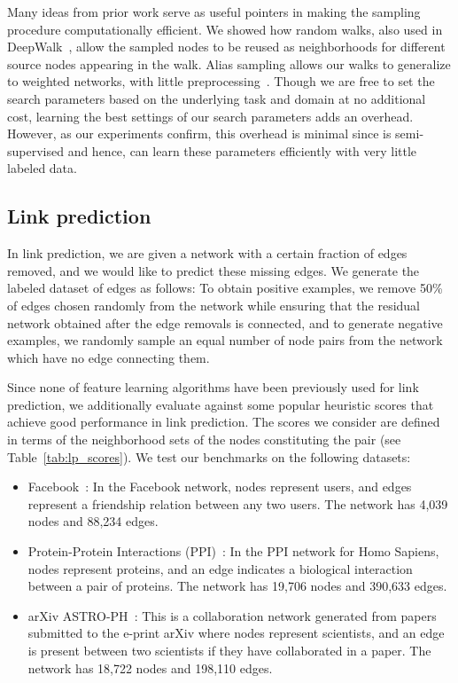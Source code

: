 Many ideas from prior work serve as useful pointers in making the sampling procedure computationally efficient. We showed how random walks, also used in DeepWalk~\cite{deepwalk}, allow the sampled nodes to be reused as neighborhoods for different source nodes appearing in the walk. Alias sampling allows our walks to generalize to weighted networks, with little preprocessing~\cite{line}. Though we are free to set the search parameters based on the underlying task and domain at no additional cost, learning the best settings of our search parameters adds an overhead. However, as our experiments confirm, this overhead is minimal since \nodevec is semi-supervised and hence, can learn these parameters efficiently with very little labeled data. 



\subsection{Link prediction}
In link prediction, we are given a network with a certain fraction of edges removed, and we would like to predict these missing edges. We generate the labeled dataset of edges as follows: To obtain positive examples, we remove 50\% of edges chosen randomly from the network while ensuring that the residual network obtained after the edge removals is connected, and to generate negative examples, we randomly sample an equal number of node pairs from the network which have no edge connecting them. 

Since none of feature learning algorithms have been previously used for link prediction, we additionally evaluate \nodevec against some popular heuristic scores that achieve good performance in link prediction. The scores we consider are defined in terms of the neighborhood sets of the nodes constituting the pair (see Table~\ref{tab:lp_scores}). We test our benchmarks on the following datasets:

\begin{itemize}[noitemsep,nolistsep]
	\item Facebook~\cite{snapnets}: In the Facebook network, nodes represent users, and edges represent a friendship relation between any two users. The network has 4,039 nodes and 88,234 edges.
	\item Protein-Protein Interactions (PPI)~\cite{biogrid}: In the PPI network for Homo Sapiens, nodes represent proteins, and an edge indicates a biological interaction between a pair of proteins. The network has 19,706 nodes and 390,633 edges.
	\item arXiv ASTRO-PH~\cite{snapnets}: This is a collaboration network generated from papers submitted to the e-print arXiv where nodes represent scientists, and an edge is present between two scientists if they have collaborated in a paper. The network has 18,722 nodes and 198,110 edges.
\end{itemize}

